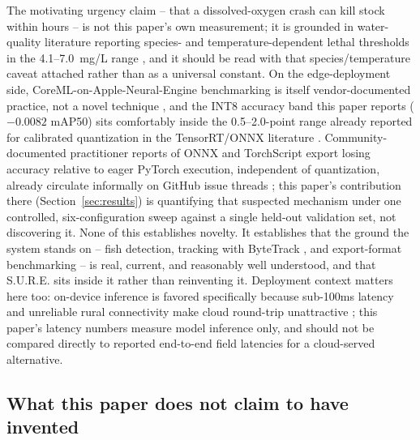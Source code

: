 The motivating urgency claim -- that a dissolved-oxygen crash can kill stock within hours -- is not
this paper's own measurement; it is grounded in water-quality literature reporting species- and
temperature-dependent lethal thresholds in the 4.1--7.0~mg/L range
\citep{lindholm2023waterquality,agmrc2026waterquality}, and it should be read with that
species/temperature caveat attached rather than as a universal constant. On the edge-deployment
side, CoreML-on-Apple-Neural-Engine benchmarking is itself vendor-documented practice, not a novel
technique \citep{ultralytics2026coreml}, and the INT8 accuracy band this paper reports
(\(-0.0082\) mAP50) sits comfortably inside the 0.5--2.0-point range already reported for
calibrated quantization in the TensorRT/ONNX literature \citep{ultralytics2025tensorrt,
arxiv2025quantrobustness}. Community-documented practitioner reports of ONNX and TorchScript
export losing accuracy relative to eager PyTorch execution, independent of quantization, already
circulate informally on GitHub issue threads \citep{github2022yolov5issue,github2024onnxissue};
this paper's contribution there (Section~\ref{sec:results}) is quantifying that suspected mechanism
under one controlled, six-configuration sweep against a single held-out validation set, not
discovering it. None of this establishes novelty. It establishes that the ground the system stands
on -- fish detection, tracking with ByteTrack \citep{zhang2022bytetrack}, and export-format
benchmarking -- is real, current, and reasonably well understood, and that S.U.R.E. sits inside it
rather than reinventing it. Deployment context matters here too: on-device inference is favored
specifically because sub-100ms latency and unreliable rural connectivity make cloud round-trip
unattractive \citep{roboflow2025cloudedge}; this paper's latency numbers measure model inference
only, and should not be compared directly to reported end-to-end field latencies for a
cloud-served alternative.

\subsection{What this paper does not claim to have invented}

